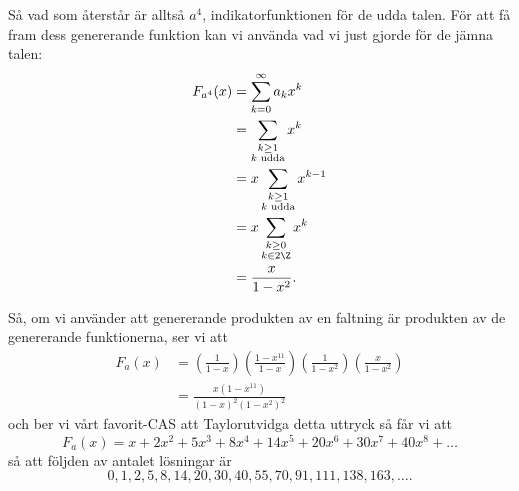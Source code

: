 \documentclass[nobib]{tufte-handout}
\begin{document}
\begin{example}
    Så vad som återstår är alltså $a^4$, indikatorfunktionen för de udda talen. För att få fram dess genererande funktion kan vi använda vad vi just gjorde för de jämna talen:
    \begin{align*}
        F_{a^4}(x) &= \sum_{k=0}^{\infty} a_k x^k\\
        &= \sum_{\substack{k \geq 1\\k\text{ udda}}} x^k\\
        &= x\sum_{\substack{k \geq 1\\k\text{ udda}}} x^{k-1}\\
        &= x\sum_{\substack{k \geq 0\\k \in 2\Z}} x^k\\
        &= \frac{x}{1 - x^2}.
    \end{align*}

    Så, om vi använder att genererande produkten av en faltning är produkten av de genererande funktionerna, ser vi att
    \begin{align*}
        F_a(x) &= \left(\frac{1}{1-x}\right)\left(\frac{1-x^{11}}{1-x}\right)\left(\frac{1}{1-x^2}\right)\left(\frac{x}{1-x^2}\right)\\
        &= \frac{x(1 - x^{11})}{(1-x)^2(1-x^2)^2}
    \end{align*}
    och ber vi vårt favorit-CAS att Taylorutvidga detta uttryck så får vi att
    $$F_a(x) = x + 2x^2 + 5x^3 + 8x^4 + 14x^5 + 20x^6 + 30x^7 + 40x^8 + \ldots$$
    så att följden av antalet lösningar är
    $$0,1,2,5,8,14,20,30,40,55,70,91,111,138,163,\ldots.$$
\end{example}
\end{document}
